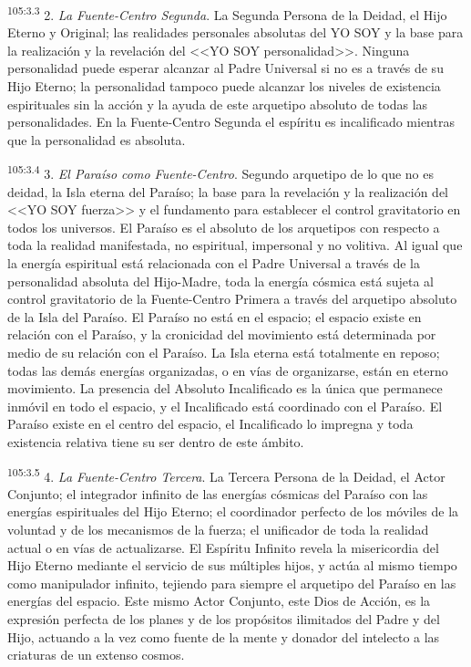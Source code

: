 \documentclass[twoside, 11pt]{book}
\begin{document}
\par
\textsuperscript{105:3.3} 2. \textit{La Fuente-Centro Segunda}. La Segunda Persona de la Deidad, el Hijo Eterno y Original; las realidades personales absolutas del YO SOY y la base para la realización y la revelación del <<YO SOY personalidad>>. Ninguna personalidad puede esperar alcanzar al Padre Universal si no es a través de su Hijo Eterno; la personalidad tampoco puede alcanzar los niveles de existencia espirituales sin la acción y la ayuda de este arquetipo absoluto de todas las personalidades. En la Fuente-Centro Segunda el espíritu es incalificado mientras que la personalidad es absoluta.

\par
\textsuperscript{105:3.4} 3. \textit{El Paraíso como Fuente-Centro}. Segundo arquetipo de lo que no es deidad, la Isla eterna del Paraíso; la base para la revelación y la realización del <<YO SOY fuerza>> y el fundamento para establecer el control gravitatorio en todos los universos. El Paraíso es el absoluto de los arquetipos con respecto a toda la realidad manifestada, no espiritual, impersonal y no volitiva. Al igual que la energía espiritual está relacionada con el Padre Universal a través de la personalidad absoluta del Hijo-Madre, toda la energía cósmica está sujeta al control gravitatorio de la Fuente-Centro Primera a través del arquetipo absoluto de la Isla del Paraíso. El Paraíso no está en el espacio; el espacio existe en relación con el Paraíso, y la cronicidad del movimiento está determinada por medio de su relación con el Paraíso. La Isla eterna está totalmente en reposo; todas las demás energías organizadas, o en vías de organizarse, están en eterno movimiento. La presencia del Absoluto Incalificado es la única que permanece inmóvil en todo el espacio, y el Incalificado está coordinado con el Paraíso. El Paraíso existe en el centro del espacio, el Incalificado lo impregna y toda existencia relativa tiene su ser dentro de este ámbito.

\par
\textsuperscript{105:3.5} 4. \textit{La Fuente-Centro Tercera}. La Tercera Persona de la Deidad, el Actor Conjunto; el integrador infinito de las energías cósmicas del Paraíso con las energías espirituales del Hijo Eterno; el coordinador perfecto de los móviles de la voluntad y de los mecanismos de la fuerza; el unificador de toda la realidad actual o en vías de actualizarse. El Espíritu Infinito revela la misericordia del Hijo Eterno mediante el servicio de sus múltiples hijos, y actúa al mismo tiempo como manipulador infinito, tejiendo para siempre el arquetipo del Paraíso en las energías del espacio. Este mismo Actor Conjunto, este Dios de Acción, es la expresión perfecta de los planes y de los propósitos ilimitados del Padre y del Hijo, actuando a la vez como fuente de la mente y donador del intelecto a las criaturas de un extenso cosmos.
\end{document}
